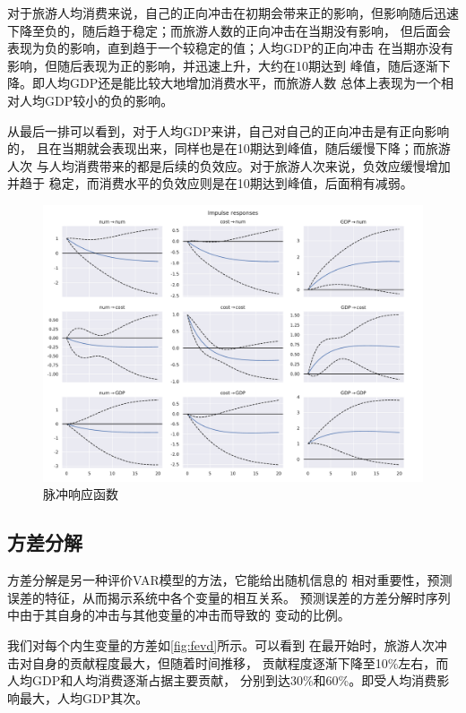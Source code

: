 \documentclass{article}
\begin{document}
    对于旅游人均消费来说，自己的正向冲击在初期会带来正的影响，但影响随后迅速
    下降至负的，随后趋于稳定；而旅游人数的正向冲击在当期没有影响，
    但后面会表现为负的影响，直到趋于一个较稳定的值；人均GDP的正向冲击
    在当期亦没有影响，但随后表现为正的影响，并迅速上升，大约在10期达到
    峰值，随后逐渐下降。即人均GDP还是能比较大地增加消费水平，而旅游人数
    总体上表现为一个相对人均GDP较小的负的影响。

    从最后一排可以看到，对于人均GDP来讲，自己对自己的正向冲击是有正向影响的，
    且在当期就会表现出来，同样也是在10期达到峰值，随后缓慢下降；而旅游人次
    与人均消费带来的都是后续的负效应。对于旅游人次来说，负效应缓慢增加并趋于
    稳定，而消费水平的负效应则是在10期达到峰值，后面稍有减弱。

    \begin{figure}[h]
        \includegraphics[width=\textwidth]{irf}
        \caption{脉冲响应函数}
        \label{fig:irf}
    \end{figure}

    \subsection{方差分解}
    方差分解是另一种评价VAR模型的方法，它能给出随机信息的
    相对重要性，预测误差的特征，从而揭示系统中各个变量的相互关系。
    预测误差的方差分解时序列中由于其自身的冲击与其他变量的冲击而导致的
    变动的比例。

    我们对每个内生变量的方差如\cref{fig:fevd}所示。可以看到
    在最开始时，旅游人次冲击对自身的贡献程度最大，但随着时间推移，
    贡献程度逐渐下降至10\%左右，而人均GDP和人均消费逐渐占据主要贡献，
    分别到达30\%和60\%。即受人均消费影响最大，人均GDP其次。
\end{document}
